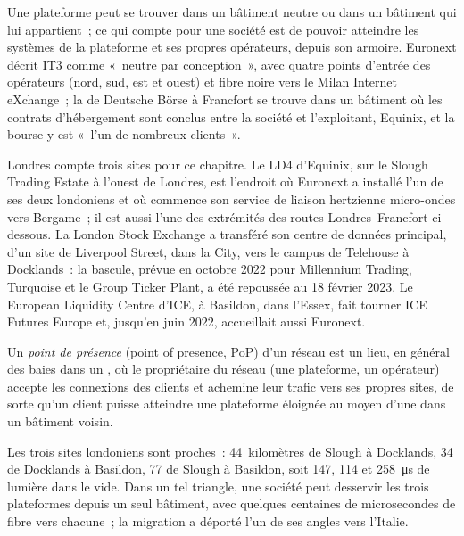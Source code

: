 Une plateforme peut se trouver dans un bâtiment neutre ou dans un bâtiment qui lui appartient~; ce qui compte pour une société est de pouvoir atteindre les systèmes de la plateforme et ses propres
opérateurs, depuis son armoire. Euronext décrit IT3 comme «~neutre par conception~», avec quatre points d'entrée des opérateurs (nord, sud, est et
ouest) et fibre noire vers le Milan Internet eXchange~; la  de Deutsche Börse à Francfort se trouve dans un bâtiment où les contrats d'hébergement
sont conclus entre la société et l'exploitant, Equinix, et la bourse y est «~l'un de nombreux clients~».

Londres compte trois sites pour ce chapitre. Le LD4 d'Equinix, sur le Slough Trading Estate à l'ouest de Londres, est l'endroit où Euronext a installé l'un de ses deux
 londoniens et où commence son service de liaison hertzienne micro-ondes vers Bergame~; il est aussi l'une des extrémités des routes Londres--Francfort ci-dessous. La
London Stock Exchange a transféré son centre de données principal, d'un site de Liverpool Street, dans la City, vers le campus de Telehouse à Docklands~: la bascule,
prévue en octobre 2022 pour Millennium Trading, Turquoise et le Group Ticker Plant, a été repoussée au 18 février 2023. Le
European Liquidity Centre d'ICE, à Basildon, dans l'Essex, fait tourner ICE Futures Europe et, jusqu'en juin 2022, accueillait aussi Euronext.

\begin{definition}\label{def:nw:the-european-map:pop}
Un \emph{point de présence} (point of presence, PoP) d'un réseau est un lieu, en général des baies dans un , où le
propriétaire du réseau (une plateforme, un opérateur) accepte les connexions des clients et achemine leur trafic vers ses propres sites, de sorte qu'un client
puisse atteindre une plateforme éloignée au moyen d'une  dans un bâtiment voisin.
\end{definition}

Les trois sites londoniens sont proches~: 44~kilomètres de Slough à Docklands, 34 de Docklands à Basildon, 77 de Slough à Basildon, soit
147, 114 et \qty{258}{\micro\second} de lumière dans le vide. Dans un tel triangle, une société peut desservir les trois plateformes depuis
un seul bâtiment, avec quelques centaines de microsecondes de fibre vers chacune~; la migration a déporté l'un de ses angles vers l'Italie.

